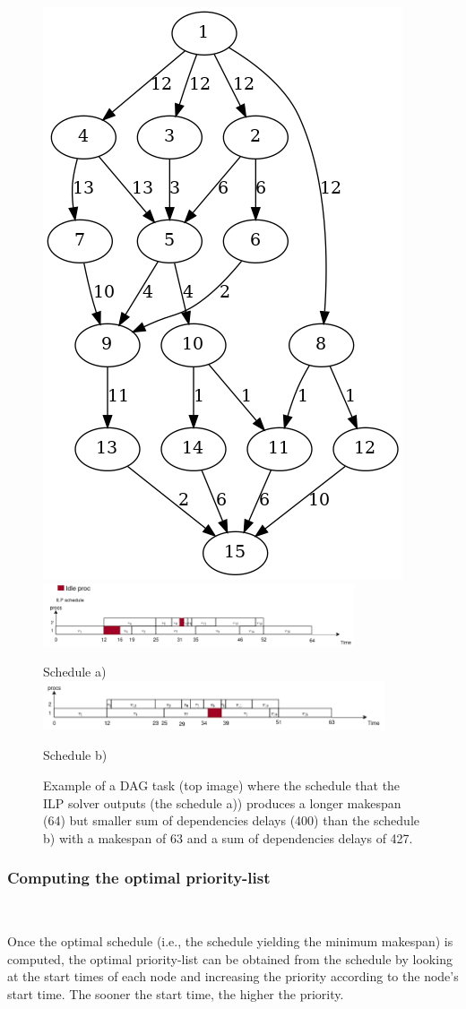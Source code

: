 \begin{figure}
    \centering
    \includegraphics[width=0.5\linewidth]{images/Tau_108.png}
    \includegraphics[width=\linewidth, height=70px]{images/schedule_ilp_fail_correct.png}
    \par Schedule a)
    \includegraphics[width=\linewidth, height=55px]{images/schedule_example_ilpfail_better.png}
    \par Schedule b)
    \caption{Example of a DAG task (top image) where the schedule that the ILP solver outputs (the schedule a))
    produces a longer makespan (64) but smaller sum of dependencies delays (400) than 
    the schedule b) with a makespan of 63 and a sum of dependencies delays of 427.}
    \label{fig:counter_example_minsumdep}
\end{figure}

\subsubsection{Computing the optimal priority-list}
~

Once the optimal schedule (i.e., the schedule yielding the minimum makespan)
is computed,
the optimal priority-list can be obtained from the schedule 
by looking at the start times of each node and increasing the priority 
according to the node's start time.
The sooner the start time, the higher the priority.

